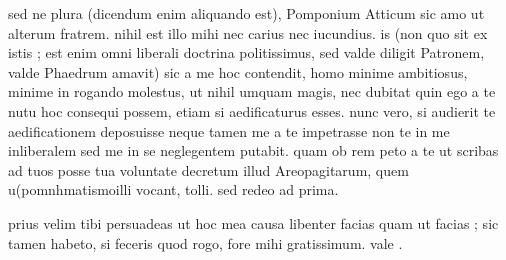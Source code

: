  sed ne plura (dicendum enim aliquando est), Pomponium Atticum sic amo ut alterum fratrem. nihil est illo mihi nec carius nec iucundius. is (non quo sit ex istis ; est enim omni liberali doctrina politissimus, sed valde diligit Patronem, valde Phaedrum amavit) sic a me hoc contendit, homo minime ambitiosus, minime in rogando molestus, ut nihil umquam magis, nec dubitat quin ego a te nutu hoc consequi possem, etiam si aedificaturus esses. nunc vero, si audierit te aedificationem deposuisse neque tamen me a te impetrasse non te in me inliberalem sed me in se neglegentem putabit. quam ob rem peto a te ut scribas ad tuos posse tua voluntate decretum illud Areopagitarum, quem u(pomnhmatismo\n illi vocant, tolli. sed redeo ad prima.

 prius velim tibi persuadeas ut hoc mea causa libenter facias quam ut facias ; sic tamen habeto, si feceris quod rogo, fore mihi gratissimum. vale .
